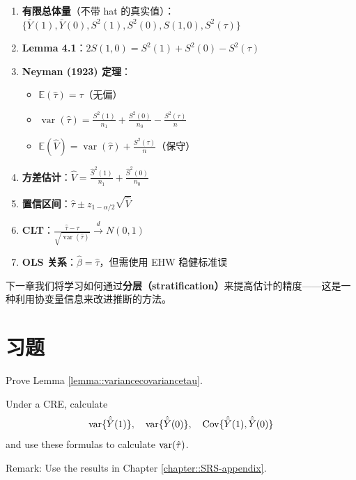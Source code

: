 \begin{enumerate}
  \item \textbf{有限总体量}（不带 hat 的真实值）：
    $\{\bar{Y}(1), \bar{Y}(0), S^2(1), S^2(0), S(1,0), S^2(\tau)\}$

  \item \textbf{Lemma 4.1}：$2S(1,0) = S^2(1) + S^2(0) - S^2(\tau)$

  \item \textbf{Neyman (1923) 定理}：
    \begin{itemize}
      \item $\mathbb{E}(\hat{\tau}) = \tau$（无偏）
      \item $\operatorname{var}(\hat{\tau}) = \frac{S^2(1)}{n_1} + \frac{S^2(0)}{n_0} - \frac{S^2(\tau)}{n}$
      \item $\mathbb{E}(\hat{V}) = \operatorname{var}(\hat{\tau}) + \frac{S^2(\tau)}{n}$（保守）
    \end{itemize}

  \item \textbf{方差估计}：$\hat{V} = \frac{\hat{S}^2(1)}{n_1} + \frac{\hat{S}^2(0)}{n_0}$

  \item \textbf{置信区间}：$\hat{\tau} \pm z_{1-\alpha/2}\sqrt{\hat{V}}$

  \item \textbf{CLT}：$\frac{\hat{\tau} - \tau}{\sqrt{\operatorname{var}(\hat{\tau})}} \xrightarrow{d} N(0,1)$

  \item \textbf{OLS 关系}：$\hat{\beta} = \hat{\tau}$，但需使用 EHW 稳健标准误
\end{enumerate}

下一章我们将学习如何通过\textbf{分层（stratification）}来提高估计的精度——这是一种利用协变量信息来改进推断的方法。

\section{习题}\label{sec:4-homework}

\begin{HomeworkProblem}\label{exr:4-1}


Prove Lemma \ref{lemma::variancecovariancetau}.


\end{HomeworkProblem}

\begin{HomeworkProblem}\label{exr:4-2}


Under a CRE, calculate
\[
\textup{var}\{  \hat{\bar{Y}}(1)  \} ,\quad
\textup{var}\{  \hat{\bar{Y}}(0)  \} ,\quad
\operatorname{Cov}\{  \hat{\bar{Y}}(1) ,  \hat{\bar{Y}}(0)  \}
\]
and use these formulas to calculate $\textup{var}(\hat{\tau} )$.

Remark: Use the results in Chapter \ref{chapter::SRS-appendix}.





\end{HomeworkProblem}

